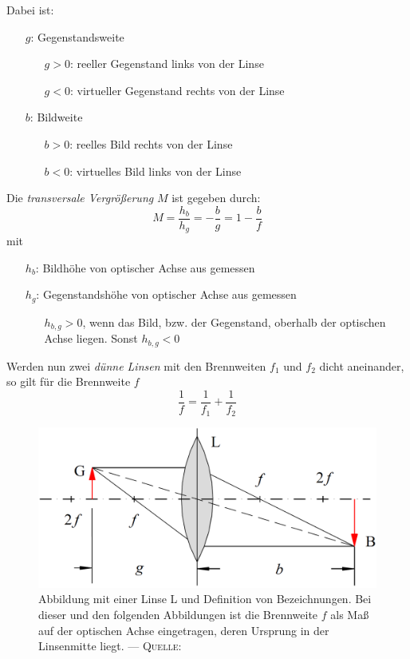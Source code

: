 \documentclass[../protokoll.tex]{subfiles}
\begin{document}
Dabei ist:
\begin{itemize}[noitemsep,leftmargin=4em]
    \item[$g$:] Gegenstandsweite
    \begin{itemize}[noitemsep,leftmargin=4em]
        \item[$g > 0$:] reeller Gegenstand links von der Linse
        \item[$g < 0$:] virtueller Gegenstand rechts von der Linse
    \end{itemize}
    \item[$b$:] Bildweite
    \begin{itemize}[noitemsep,leftmargin=4em]
        \item[$b > 0$:] reelles Bild rechts von der Linse
        \item[$b < 0$:] virtuelles Bild links von der Linse
    \end{itemize}
\end{itemize}
Die \textsl{transversale Vergrößerung} $M$ ist gegeben durch:
\begin{equation}\label{eq:transversale Vergrößerung}
    M = \dfrac{h_b}{h_g} = - \dfrac{b}{g} = 1 - \dfrac{b}{f}
\end{equation}
mit
\begin{itemize}[nosep, noitemsep]
    \item[$h_b$:] Bildhöhe von optischer Achse aus gemessen
    \item[$h_g$:] Gegenstandshöhe von optischer Achse aus gemessen
    
    \begin{itemize}[nosep, noitemsep,leftmargin=2.25em]
        \item[$h_{b,g} > 0$,] wenn das Bild, bzw. der Gegenstand, oberhalb der optischen Achse liegen. Sonst $h_{b,g} < 0$
    \end{itemize}
\end{itemize}

Werden nun zwei \textsl{dünne Linsen} mit den Brennweiten $f_1$ und $f_2$ dicht aneinander, so gilt für die Brennweite $f$
\begin{equation}
    \dfrac{1}{f} = \dfrac{1}{f_1}+\dfrac{1}{f_2}
\end{equation}

\begin{figure}[H]
    \centering
    \includegraphics[width=0.4\linewidth]{2023-05-08 - V4 - Geometrische Optik, optische Abbildung und Aberrationen/images/theory/linsengleichung.png}
    \caption{Abbildung mit einer Linse L und Definition von Bezeichnungen. Bei dieser und den folgenden Abbildungen ist die Brennweite $f$ als Maß auf der optischen Achse eingetragen, deren Ursprung in der Linsenmitte liegt. ---
    \textsc{Quelle}: \cite[S. 44 -- Abb. 3]{script}}
    \label{fig:Theorie/Linsengleichung}
\end{figure}
\end{document}

